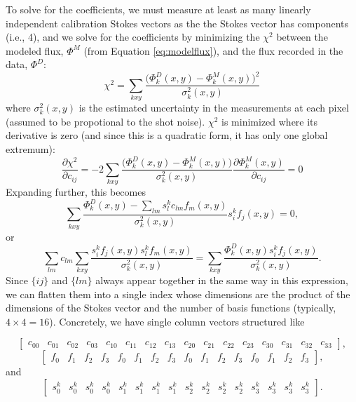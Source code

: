 \documentclass[11pt]{article}
\begin{document}
To solve for the coefficients, we must measure at least as many linearly independent calibration Stokes vectors as the the Stokes vector has components (i.e., 4), and we solve for the coefficients by minimizing the $\chi^2$ between the modeled flux, $\Phi^M$ (from Equation \ref{eq:modelflux}), and the flux recorded in the data, $\Phi^D$:
\begin{equation}
\chi^2 = \sum_{kxy} \frac{\big(\Phi^D_k(x,y)-\Phi^M_k(x,y)\big)^2}{\sigma^2_k(x,y)}
\end{equation}
where $\sigma^2_k(x,y)$ is the estimated uncertainty in the measurements at each pixel (assumed to be propotional to the shot noise). $\chi^2$ is minimized where its derivative is zero (and since this is a quadratic form, it has only one global extremum):
\begin{equation}
	\frac{\partial\chi^2}{\partial c_{ij}} = -2\sum_{kxy}\frac{\big(\Phi^D_k(x,y)-\Phi^M_k(x,y)\big)}{\sigma^2_k(x,y)}\frac{\partial\Phi^M_k(x,y)}{\partial c_{ij}} = 0
\end{equation}
Expanding further, this becomes
\begin{equation}
	\sum_{kxy}\frac{\Phi^D_k(x,y)-\sum_{lm} s^k_l c_{lm}f_{m}(x,y)}{\sigma^2_k(x,y)}s^k_i f_{j}(x,y)=0,
\end{equation}
or
\begin{equation}\label{eq:coefs_expanded}
	\sum_{lm} c_{lm} \sum_{kxy}\frac{s^k_i f_j(x,y) s^k_l f_m(x,y)}{\sigma^2_k(x,y)} = \sum_{kxy}\frac{\Phi^D_k(x,y) s^k_i f_j(x,y)}{\sigma^2_k(x,y)}.
\end{equation}
Since $\{ij\}$ and $\{lm\}$ always appear together in the same way in this expression, we can flatten them into a single index whose dimensions are the product of the dimensions of the Stokes vector and the number of basis functions (typically, $4\times 4=16$). Concretely, we have single column vectors structured like

\begin{equation}
	\begin{bmatrix}
		c_{00} & c_{01} & c_{02} & c_{03} & c_{10} & c_{11} & c_{12} & c_{13} & c_{20} & c_{21} & c_{22} & c_{23} & c_{30} & c_{31} & c_{32} & c_{33}
	\end{bmatrix},
\end{equation}
\begin{equation}
	\begin{bmatrix}
		f_0 & f_1 & f_2 & f_3 & f_0 & f_1 & f_2 & f_3 & f_0 & f_1 & f_2 & f_3 & f_0 & f_1 & f_2 & f_3
	\end{bmatrix},
\end{equation}
and
\begin{equation}
	\begin{bmatrix}
		s^k_0 & s^k_0 & s^k_0 & s^k_0 & s^k_1 & s^k_1 & s^k_1 & s^k_1 & s^k_2 & s^k_2 & s^k_2 & s^k_2 & s^k_3 & s^k_3 & s^k_3 & s^k_3
	\end{bmatrix}.
\end{equation}
\end{document}
